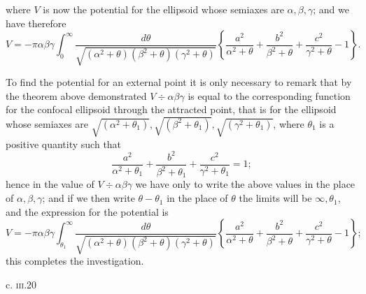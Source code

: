 \documentclass[11pt]{article}
\begin{document}
\medskip

\noindent where $V$ is now the potential for the ellipsoid whose semiaxes are $\alpha, \beta, \gamma$; and we have therefore
\[
V = -\pi\alpha\beta\gamma\int_{0}^{\infty} \frac{d\theta}{\sqrt{(\alpha^{2} + \theta)(\beta^{2} + \theta)(\gamma^{2} + \theta)}}\left\{\frac{a^{2}}{\alpha^{2} + \theta} + \frac{b^{2}}{\beta^{2} + \theta} + \frac{c^{2}}{\gamma^{2} + \theta} - 1\right\}.
\]

To find the potential for an external point it is only necessary to remark that by the theorem above demonstrated $V \div \alpha\beta\gamma$ is equal to the corresponding function for the confocal ellipsoid through the attracted point, that is for the ellipsoid whose semiaxes are $\sqrt{(\alpha^{2} + \theta_{1})}, \sqrt{(\beta^{2} + \theta_{1})}, \sqrt{(\gamma^{2} + \theta_{1})}$, where $\theta_{1}$ is a positive quantity such that
\[
\frac{a^{2}}{\alpha^{2} + \theta_{1}} + \frac{b^{2}}{\beta^{2} + \theta_{1}} + \frac{c^{2}}{\gamma^{2} + \theta_{1}} = 1;
\]
hence in the value of $V \div \alpha\beta\gamma$ we have only to write the above values in the place of $\alpha, \beta, \gamma$; and if we then write $\theta - \theta_{1}$ in the place of $\theta$ the limits will be $\infty, \theta_{1}$, and the expression for the potential is
\[
V = -\pi\alpha\beta\gamma\int_{\theta_{1}}^{\infty} \frac{d\theta}{\sqrt{(\alpha^{2} + \theta)(\beta^{2} + \theta)(\gamma^{2} + \theta)}}\left\{\frac{a^{2}}{\alpha^{2} + \theta} + \frac{b^{2}}{\beta^{2} + \theta} + \frac{c^{2}}{\gamma^{2} + \theta} - 1\right\};
\]
this completes the investigation.

\bigskip

\hfill c. \textsc{iii}.\hfill 20
\end{document}
